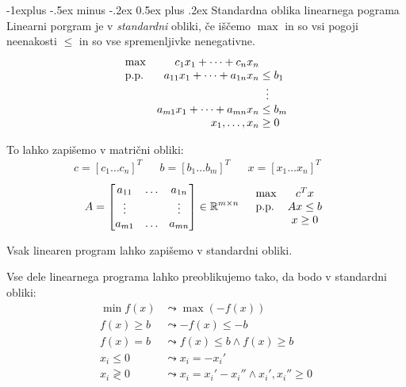 \documentclass[a4paper,8pt]{extarticle}
\makeatletter
\renewcommand{\subsection}{\@startsection{subsection}{2}{0mm}%
                                {-1explus -.5ex minus -.2ex}%
                                {0.5ex plus .2ex}%
                                {\normalfont\normalsize\bfseries}}
\makeatother
\begin{document}
\begin{multicols}{4}
\subsection{Standardna oblika linearnega pograma}
Linearni porgram je v \emph{standardni} obliki, če iščemo $\max$ in so vsi pogoji neenakosti $\leq$ in so vse spremenljivke nenegativne.
\begin{align*}
	\begin{array}{l r@{\;} l} %
		\max 		& c_1 x_1 + \dots + c_n x_n	\\		
		\text{p.p.} & a_{11} x_1 + \dots + a_{1n} x_n &\leq b_1 \\
		& 									& \  \vdots \\										
		& a_{m1} x_1  + \dots + a_{mn} x_n &\leq b_m \\
		& x_1, \dots , x_n & \geq 0
	\end{array}
\end{align*}

To lahko zapišemo v matrični obliki:
\begin{align*}
	c = [c_1 \dots c_n]^T &&
	b = [b_1 \dots b_m]^T &&
	x = [x_1 \dots x_n]^T &&
\end{align*}
\begin{align*}
	A = \begin{bmatrix}
		a_{11} & \dots & a_{1n} \\
		\vdots & 	   & \vdots \\
		a_{m1} & \dots & a_{mn} \\
	\end{bmatrix}
	\in \mathbb{R}^{m \times n}
	&&
	\begin{array}{l@{\hspace{10pt}} c}
		\max & c^Tx \\
		\text{p.p.} & Ax \leq b \\
		& x \geq 0
	\end{array}
\end{align*}

Vsak linearen program lahko zapišemo v standardni obliki.

Vse dele linearnega programa lahko preoblikujemo tako, da bodo v standardni obliki:
\begin{align*}
	\min f(x) &\leadsto \max(-f(x)) \\
	f(x) \geq b &\leadsto -f(x) \leq -b \\
	f(x) = b &\leadsto f(x) \leq b \wedge f(x) \geq b \\
	x_i \leq 0 &\leadsto x_i = -x_i' \\
	x_i \gtrless 0 &\leadsto  x_i = x_i' - x_i'' \wedge x_i', x_i'' \geq 0
\end{align*}



\end{multicols}
\end{document}
